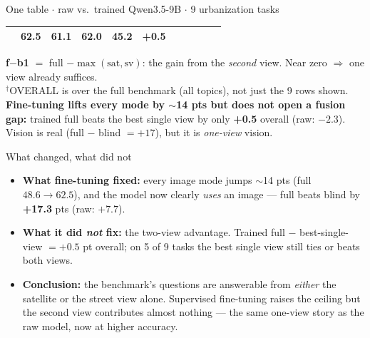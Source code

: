 \documentclass[aspectratio=169]{beamer}
\begin{document}
\begin{frame}{One table \textbf{$\cdot$} raw vs.\ trained Qwen3.5-9B \textbf{$\cdot$} 9 urbanization tasks}
\begin{tabular}{l cccc R | cccc R}
                           & \textbf{62.5} & \textbf{61.1} & \textbf{62.0} & \textbf{45.2} & \textbf{+0.5} \\
\bottomrule
\end{tabular}
\vfill\footnotesize
\textbf{f$-$b1} $=$ full $-\max(\text{sat},\text{sv})$: the gain from the \emph{second} view. Near zero $\Rightarrow$ one view already suffices.\\
$^\dagger$OVERALL is over the full benchmark (all topics), not just the 9 rows shown.
\textbf{Fine-tuning lifts every mode by $\sim$14 pts but does not open a fusion gap:} trained full beats the best single view
by only \textbf{+0.5} overall (raw: $-2.3$). Vision is real (full $-$ blind $=+17$), but it is \emph{one-view} vision.
\end{frame}

\begin{frame}{What changed, what did not}
\begin{itemize}
  \item \textbf{What fine-tuning fixed:} every image mode jumps $\sim$14 pts (full $48.6\!\to\!62.5$),
        and the model now clearly \emph{uses} an image --- full beats blind by \textbf{+17.3} pts (raw: $+7.7$).
  \item \textbf{What it did \emph{not} fix:} the two-view advantage. Trained full $-$ best-single-view $=\mathbf{+0.5}$ pt
        overall; on 5 of 9 tasks the best single view still ties or beats both views.
  \item \textbf{Conclusion:} the benchmark's questions are answerable from \emph{either} the satellite or the
        street view alone. Supervised fine-tuning raises the ceiling but the second view contributes almost nothing ---
        the same one-view story as the raw model, now at higher accuracy.
\end{itemize}
\end{frame}
\end{document}
